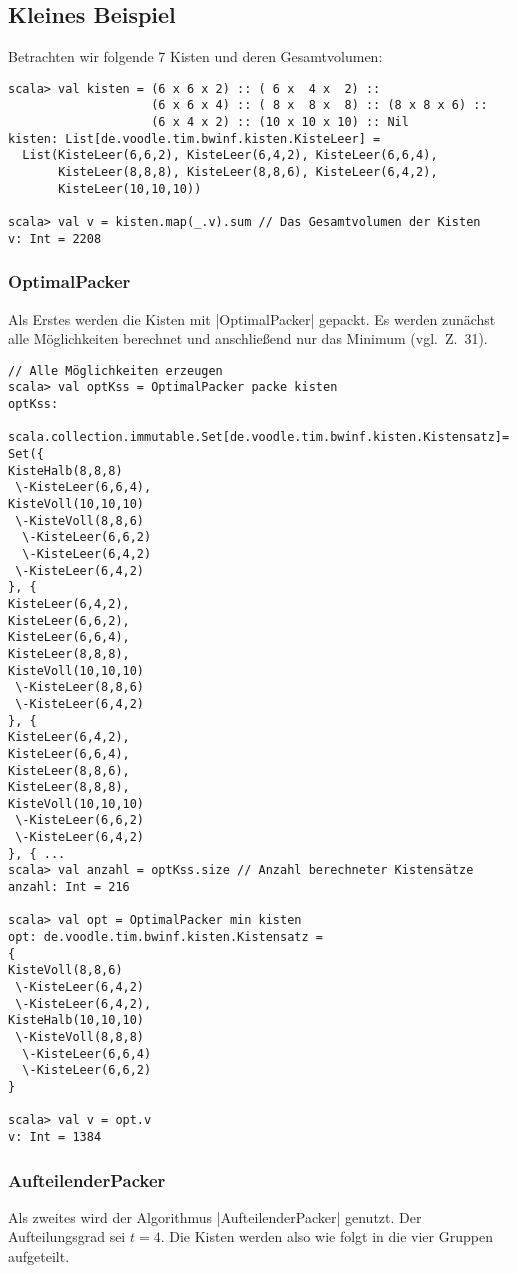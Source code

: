 \subsection{Kleines Beispiel}
Betrachten wir folgende 7 Kisten und deren Gesamtvolumen:
\begin{lstlisting}
scala> val kisten = (6 x 6 x 2) :: ( 6 x  4 x  2) ::
                    (6 x 6 x 4) :: ( 8 x  8 x  8) :: (8 x 8 x 6) ::
                    (6 x 4 x 2) :: (10 x 10 x 10) :: Nil
kisten: List[de.voodle.tim.bwinf.kisten.KisteLeer] =
  List(KisteLeer(6,6,2), KisteLeer(6,4,2), KisteLeer(6,6,4),
       KisteLeer(8,8,8), KisteLeer(8,8,6), KisteLeer(6,4,2),
       KisteLeer(10,10,10))

scala> val v = kisten.map(_.v).sum // Das Gesamtvolumen der Kisten
v: Int = 2208

\end{lstlisting}

\subsubsection*{OptimalPacker}
Als Erstes werden die Kisten mit |OptimalPacker| gepackt.
Es werden zunächst alle Möglichkeiten berechnet und anschließend nur das Minimum (vgl.\ Z.\ 31).

\begin{lstlisting}
// Alle Möglichkeiten erzeugen
scala> val optKss = OptimalPacker packe kisten
optKss:
 scala.collection.immutable.Set[de.voodle.tim.bwinf.kisten.Kistensatz]=
Set({
KisteHalb(8,8,8)
 \-KisteLeer(6,6,4),
KisteVoll(10,10,10)
 \-KisteVoll(8,8,6)
  \-KisteLeer(6,6,2)
  \-KisteLeer(6,4,2)
 \-KisteLeer(6,4,2)
}, {
KisteLeer(6,4,2),
KisteLeer(6,6,2),
KisteLeer(6,6,4),
KisteLeer(8,8,8),
KisteVoll(10,10,10)
 \-KisteLeer(8,8,6)
 \-KisteLeer(6,4,2)
}, {
KisteLeer(6,4,2),
KisteLeer(6,6,4),
KisteLeer(8,8,6),
KisteLeer(8,8,8),
KisteVoll(10,10,10)
 \-KisteLeer(6,6,2)
 \-KisteLeer(6,4,2)
}, { ...
scala> val anzahl = optKss.size // Anzahl berechneter Kistensätze
anzahl: Int = 216

scala> val opt = OptimalPacker min kisten
opt: de.voodle.tim.bwinf.kisten.Kistensatz = 
{
KisteVoll(8,8,6)
 \-KisteLeer(6,4,2)
 \-KisteLeer(6,4,2),
KisteHalb(10,10,10)
 \-KisteVoll(8,8,8)
  \-KisteLeer(6,6,4)
  \-KisteLeer(6,6,2)
}

scala> val v = opt.v
v: Int = 1384
\end{lstlisting}

\subsubsection*{AufteilenderPacker}
Als zweites wird der Algorithmus |AufteilenderPacker| genutzt.
Der Aufteilungsgrad sei $t=4$.
Die Kisten werden also wie folgt in die vier Gruppen aufgeteilt.

